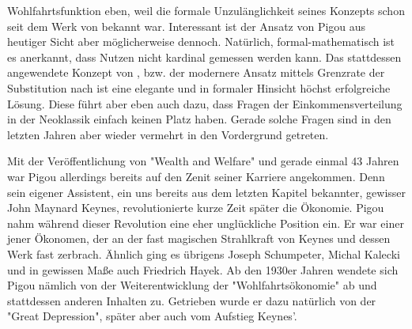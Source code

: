 Wohlfahrtsfunktion eben, weil die formale Unzulänglichkeit seines Konzepts schon seit dem Werk von \textcite{Pareto1906} bekannt war. Interessant ist der Ansatz von Pigou aus heutiger Sicht aber möglicherweise dennoch. Natürlich, formal-mathematisch ist es anerkannt, dass Nutzen nicht kardinal gemessen werden kann. Das stattdessen angewendete  Konzept von \textcite{Pareto1906}, bzw. der modernere Ansatz mittels Grenzrate der Substitution nach \textcite{Hicks1934b} ist eine elegante und in formaler Hinsicht höchst erfolgreiche Lösung. Diese führt aber eben auch dazu, dass Fragen der Einkommensverteilung in der Neoklassik einfach keinen Platz haben. Gerade solche Fragen sind in den letzten Jahren aber wieder vermehrt in den Vordergrund getreten.

Mit der Veröffentlichung von "Wealth and Welfare" und gerade einmal 43 Jahren war Pigou allerdings bereits auf den Zenit seiner Karriere angekommen. Denn sein eigener Assistent, ein uns bereits aus dem letzten Kapitel bekannter, gewisser John Maynard Keynes, revolutionierte kurze Zeit später die Ökonomie. Pigou nahm während dieser Revolution eine eher unglückliche Position ein. Er war einer jener Ökonomen, der an der fast magischen Strahlkraft von Keynes und dessen Werk fast zerbrach. Ähnlich ging es übrigens Joseph Schumpeter, Michal Kalecki und in gewissen Maße auch Friedrich Hayek. Ab den 1930er Jahren wendete sich Pigou nämlich von der Weiterentwicklung der "Wohlfahrtsökonomie" ab und stattdessen anderen Inhalten zu. Getrieben wurde er dazu natürlich von der "Great Depression", später aber auch vom Aufstieg Keynes'.  

